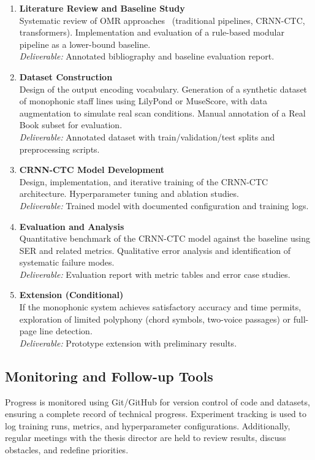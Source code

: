 \documentclass[11pt, a4paper]{article}
\begin{document}
\begin{enumerate}
    \item \textbf{Literature Review and Baseline Study} \\
    Systematic review of OMR approaches~\cite{shatriOPTICALMUSICRECOGNITION} (traditional pipelines, CRNN-CTC, transformers). Implementation and evaluation of a rule-based modular pipeline as a lower-bound baseline. \\
    \textit{Deliverable:} Annotated bibliography and baseline evaluation report.

    \item \textbf{Dataset Construction} \\
    Design of the output encoding vocabulary. Generation of a synthetic dataset of monophonic staff lines using LilyPond or MuseScore, with data augmentation to simulate real scan conditions. Manual annotation of a Real Book subset for evaluation. \\
    \textit{Deliverable:} Annotated dataset with train/validation/test splits and preprocessing scripts.

    \item \textbf{CRNN-CTC Model Development} \\
    Design, implementation, and iterative training of the CRNN-CTC architecture. Hyperparameter tuning and ablation studies. \\
    \textit{Deliverable:} Trained model with documented configuration and training logs.

    \item \textbf{Evaluation and Analysis} \\
    Quantitative benchmark of the CRNN-CTC model against the baseline using SER and related metrics. Qualitative error analysis and identification of systematic failure modes. \\
    \textit{Deliverable:} Evaluation report with metric tables and error case studies.

    \item \textbf{Extension (Conditional)} \\
    If the monophonic system achieves satisfactory accuracy and time permits, exploration of limited polyphony (chord symbols, two-voice passages) or full-page line detection. \\
    \textit{Deliverable:} Prototype extension with preliminary results.
\end{enumerate}

\subsection{Monitoring and Follow-up Tools}
Progress is monitored using Git/GitHub for version control of code and datasets, ensuring a complete record of technical progress. Experiment tracking is used to log training runs, metrics, and hyperparameter configurations. Additionally, regular meetings with the thesis director are held to review results, discuss obstacles, and redefine priorities.


\newpage
\printbibliography[heading=bibintoc, title={References}]
\end{document}
